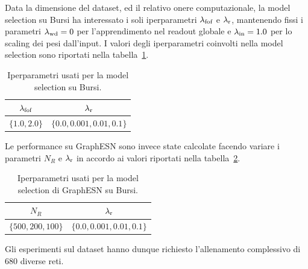 Data la dimensione del dataset, ed il relativo onere computazionale, la model selection su Bursi ha interessato i soli iperparametri $\lambda_\textup{fof}$ e $\lambda_\textup{r}$, mantenendo fissi i parametri $\lambda_\textup{wd} = 0$ per l'apprendimento nel readout globale e $\lambda_\textup{in} = 1.0$ per lo scaling dei pesi dall'input.
I valori degli iperparametri coinvolti nella model selection sono riportati nella tabella~\ref{tab:esperimenti:grigliaBursi}.
\begin{table}[tbp]
\small
\caption[Model selection: iperparametri per Bursi]{Iperparametri usati per la model selection su Bursi.}
\label{tab:esperimenti:grigliaBursi}
\centering
\begin{tabular}{*{2}{c}}
\toprule
$\lambda_\textup{fof}$ & $\lambda_\textup{r}$ \\
\midrule
$\lbrace 1.0, 2.0 \rbrace$ & $\lbrace 0.0, 0.001, 0.01, 0.1 \rbrace$ \\
\bottomrule
\end{tabular}
\end{table}
%
Le performance su GraphESN sono invece state calcolate facendo variare i parametri $N_R$ e $\lambda_\textup{r}$ in accordo ai valori riportati nella tabella~\ref{tab:esperimenti:grigliaBursiStandard}.
\begin{table}[tbp]
\small
\caption[Model selection: iperparametri per GraphESN su Bursi]{Iperparametri usati per la model selection di GraphESN su Bursi.}
\label{tab:esperimenti:grigliaBursiStandard}
\centering
\begin{tabular}{*{2}{c}}
\toprule
$N_R$ & $\lambda_\textup{r}$ \\
\midrule
$\lbrace 500, 200, 100 \rbrace$ & $\lbrace 0.0, 0.001, 0.01, 0.1 \rbrace$ \\
\bottomrule
\end{tabular}
\end{table}
%
Gli esperimenti sul dataset hanno dunque richiesto l'allenamento complessivo di $680$ diverse reti.

